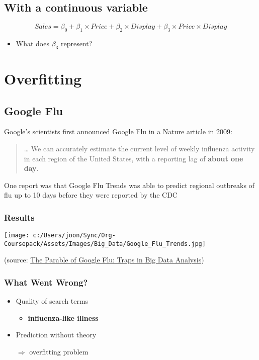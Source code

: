 \documentclass[10pt,article]{article}
\begin{document}
\subsection{With a continuous variable}
\label{sec:orgd1973f7}

\[  Sales = \beta_0 + \beta_1 \times Price + \beta_2 \times Display + \beta_3 \times Price \times Display \]
\begin{itemize}
\item What does \(\beta_3\) represent?
\end{itemize}
\clearpage
\section{Overfitting}
\label{sec:orgea553e3}
\subsection{Google Flu}
\label{sec:orgb9ec817}
Google's scientists first announced Google Flu in a Nature article in 2009:

\begin{quote}
\ldots{} We can accurately estimate the current level of weekly influenza activity
in each region of the United States, with a reporting lag of \textbf{about one day}.
\end{quote}

One report was that Google Flu Trends was able to predict regional
outbreaks of flu up to 10 days before they were reported by the CDC

\subsubsection{Results}
\label{sec:org88e9403}
\begin{center}
\texttt{[image: c:/Users/joon/Sync/Org-Coursepack/Assets/Images/Big\_Data/Google\_Flu\_Trends.jpg]}
\end{center}

(source: \href{http://www.uvm.edu/\~cdanfort/csc-reading-group/lazer-flu-science-2014.pdf}{The Parable of Google Flu: Traps in Big Data Analysis})

\subsubsection{What Went Wrong?}
\label{sec:org5a33904}

\begin{itemize}
\item Quality of search terms

\begin{itemize}
\item \textbf{influenza-like illness}
\end{itemize}

\item Prediction without theory

\(\Rightarrow\) overfitting problem
\end{itemize}
\end{document}
